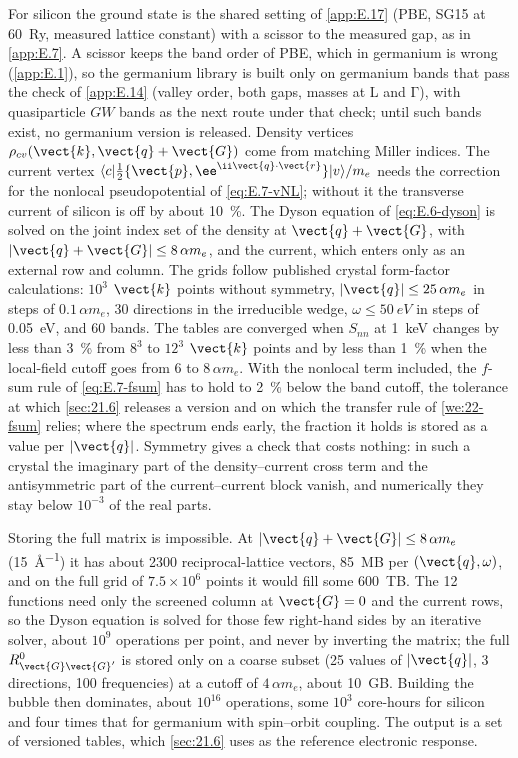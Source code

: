 For silicon the ground state is the shared setting of \cref{app:E.17} (PBE, SG15 at \SI{60}{Ry}, measured lattice constant) with a scissor to the measured gap, as in \cref{app:E.7}. A scissor keeps the band order of PBE, which in germanium is wrong (\cref{app:E.1}), so the germanium library is built only on germanium bands that pass the check of \cref{app:E.14} (valley order, both gaps, masses at L and $\mathrm{\Gamma}$), with quasiparticle $GW$ bands as the next route under that check; until such bands exist, no germanium version is released. Density vertices $\rho_{cv}(\vect{k},\vect{q}+\vect{G})$ come from matching Miller indices. The current vertex $\langle c|\tfrac12\{\vect{p},\ee^{\ii\vect{q}\cdot\vect{r}}\}|v\rangle/m_e$ needs the correction for the nonlocal pseudopotential of \cref{eq:E.7-vNL}; without it the transverse current of silicon is off by about \SI{10}{\percent}. The Dyson equation of \cref{eq:E.6-dyson} is solved on the joint index set of the density at $\vect{q}+\vect{G}$, with $|\vect{q}+\vect{G}| \le 8\,\alpha m_e$, and the current, which enters only as an external row and column. The grids follow published crystal form-factor calculations: $10^3$ $\vect{k}$ points without symmetry, $|\vect{q}| \le 25\,\alpha m_e$ in steps of $0.1\,\alpha m_e$, 30 directions in the irreducible wedge, $\omega \le \SI{50}{eV}$ in steps of \SI{0.05}{eV}, and 60 bands. The tables are converged when $S_{nn}$ at \SI{1}{keV} changes by less than \SI{3}{\percent} from $8^3$ to $12^3$ $\vect{k}$ points and by less than \SI{1}{\percent} when the local-field cutoff goes from 6 to $8\,\alpha m_e$. With the nonlocal term included, the $f$-sum rule of \cref{eq:E.7-fsum} has to hold to \SI{2}{\percent} below the band cutoff, the tolerance at which \cref{sec:21.6} releases a version and on which the transfer rule of \cref{we:22-fsum} relies; where the spectrum ends early, the fraction it holds is stored as a value per $|\vect{q}|$. Symmetry gives a check that costs nothing: in such a crystal the imaginary part of the density--current cross term and the antisymmetric part of the current--current block vanish, and numerically they stay below $10^{-3}$ of the real parts.

Storing the full matrix is impossible. At $|\vect{q}+\vect{G}| \le 8\,\alpha m_e$ (\SI{15}{\angstrom^{-1}}) it has about 2300 reciprocal-lattice vectors, \SI{85}{MB} per $(\vect{q},\omega)$, and on the full grid of $7.5\times10^6$ points it would fill some \SI{600}{TB}. The 12 functions need only the screened column at $\vect{G} = 0$ and the current rows, so the Dyson equation is solved for those few right-hand sides by an iterative solver, about $10^9$ operations per point, and never by inverting the matrix; the full $R^0_{\vect{G}\vect{G}'}$ is stored only on a coarse subset (25 values of $|\vect{q}|$, 3 directions, 100 frequencies) at a cutoff of $4\,\alpha m_e$, about \SI{10}{GB}. Building the bubble then dominates, about $10^{16}$ operations, some $10^3$ core-hours for silicon and four times that for germanium with spin--orbit coupling. The output is a set of versioned tables, which \cref{sec:21.6} uses as the reference electronic response.

